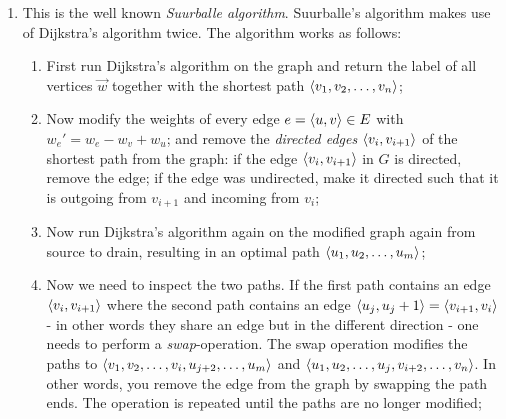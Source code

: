 \documentclass{article}
\begin{document}
\begin{exercise}
\begin{answer}
\begin{enumerate}
\begin{proof}
 \paragraph{}
 Since we do this $n-1$, times, the vertices are labeled with a path that contain $n-1$ or less edges. This is the largest path with respect to the number of edges possible. If by applying the step again weights change, this means that for at least one vertex, there exists a path of length $n$ results in a shorter path than that of $n-1$. A path that contains $n$ edges however contains at least one edge twice, this thus means there is a loop somewhere. In that case it is beneficial to keep looping over the graph, otherwise one would never have added the edge twice.
 \paragraph{}
 Given there is no such loop, we have calculated the weights for all the vertices for paths with at most $n-1$ edges. Since we know there are no cycles, it means we have iterated over all cycle-free paths and that the destination vertex $v$ will be marked with the shortest path.
 \end{proof}
 \item This is the well known \emph{Suurballe algorithm}. Suurballe's algorithm makes use of Dijkstra's algorithm twice. The algorithm works as follows:
 \begin{enumerate}
  \item First run Dijkstra's algorithm on the graph and return the label of all vertices $\vec{w}$ together with the shortest path $\left\langle v_1,v_2,\ldots,v_n \right\rangle$;
  \item Now modify the weights of every edge $e=\left\langle u,v \right\rangle\in E$ with $w_e'=w_e-w_v+w_u$; and remove the \emph{directed edges} $\left\langle v_i,v_{i+1} \right\rangle$ of the shortest path from the graph: if the edge $\left\langle v_i,v_{i+1} \right\rangle$ in $G$ is directed, remove the edge; if the edge was undirected, make it directed such that it is outgoing from $v_{i+1}$ and incoming from $v_{i}$;
  \item Now run Dijkstra's algorithm again on the modified graph again from source to drain, resulting in an optimal path $\left\langle u_1,u_2,\ldots,u_m \right\rangle$;
  \item Now we need to inspect the two paths. If the first path contains an edge $\left\langle v_i,v_{i+1} \right\rangle$ where the second path contains an edge $\left\langle u_j,u_j+1 \right\rangle=\left\langle v_{i+1},v_i \right\rangle$ - in other words they share an edge but in the different direction - one needs to perform a \emph{swap}-operation. The swap operation modifies the paths to $\left\langle v_1,v_2,\ldots,v_i,u_{j+2},\ldots,u_m \right\rangle$ and $\left\langle u_1,u_2,\ldots,u_j,v_{i+2},\ldots,v_n \right\rangle$. In other words, you remove the edge from the graph by swapping the path ends. The operation is repeated until the paths are no longer modified;

\end{enumerate}
\end{enumerate}
\end{answer}
\end{exercise}
\end{document}
